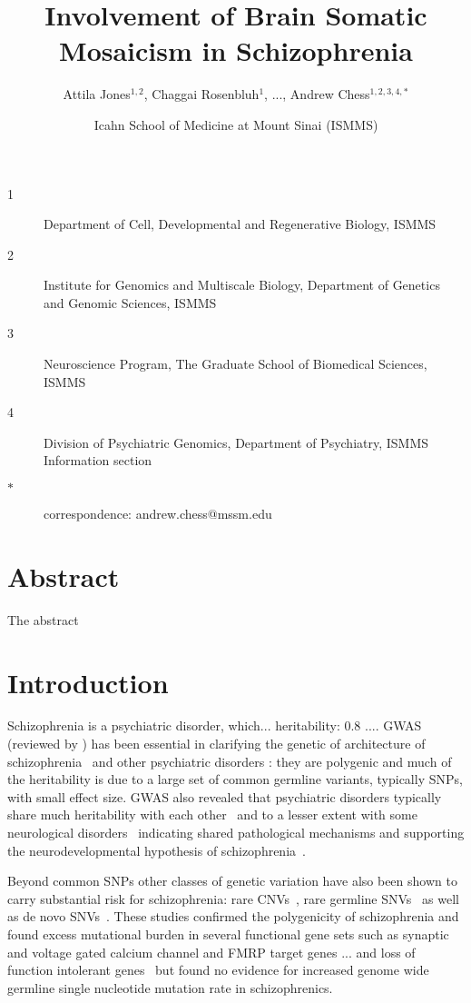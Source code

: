\documentclass[letterpaper]{article}
\title{Involvement of Brain Somatic Mosaicism in Schizophrenia}
\author{Attila Jones\(^{1,2}\), Chaggai Rosenbluh\(^{1}\), ..., Andrew Chess\(^{1,2,3,4,\ast}\)}
\date{Icahn School of Medicine at Mount Sinai (ISMMS)}
\begin{document}
\maketitle

\begin{description}
\item[1] Department of Cell, Developmental and Regenerative Biology, ISMMS 
\item[2] Institute for Genomics and Multiscale Biology, Department of Genetics and Genomic Sciences, ISMMS 
\item[3] Neuroscience Program, The Graduate School of Biomedical Sciences, ISMMS 
\item[4] Division of Psychiatric Genomics, Department of Psychiatry, ISMMS 
Information section
\item[\(\ast\)] correspondence: andrew.chess@mssm.edu 
\end{description}

\clearpage

\section*{Abstract}

The abstract

\section*{Introduction}

Schizophrenia is a psychiatric disorder, which... heritability: 0.8 ...\citep{Kahn2015}.  
GWAS (reviewed by \cite{Visscher2017}) has been essential in clarifying the
genetic of architecture of schizophrenia~\citep{Ripke2014,Pardinas2018} and other psychiatric disorders
\citep{Sullivan2012}: they are polygenic and much of the heritability is due to
a large set of common germline variants, typically SNPs, with
small effect size.  GWAS also revealed that psychiatric disorders
typically share much heritability with each
other~\citep{Consortium2009,PsychiatricGenomicsConsortium2013} and to a lesser extent with
some neurological disorders~\citep{Consortium2018} indicating shared
pathological mechanisms and supporting the neurodevelopmental hypothesis of
schizophrenia~\citep{Nour2015}.

Beyond common SNPs other classes of genetic variation have also been shown to
carry substantial risk for schizophrenia: rare CNVs~\citep{Rees2014}, rare germline
SNVs~\citep{Purcell2014,Singh2017} as well as de novo
SNVs~\citep{Fromer2014,Rees2020}.  These studies confirmed the polygenicity of
schizophrenia and found excess mutational burden in several functional
gene sets such as synaptic and voltage gated calcium channel and FMRP target
genes\citep{Fromer2014,Purcell2014} ... and loss of function intolerant
genes~\citep{Rees2020,Singh2017} but found no evidence for increased genome
wide germline single nucleotide mutation rate in schizophrenics.
\end{document}
